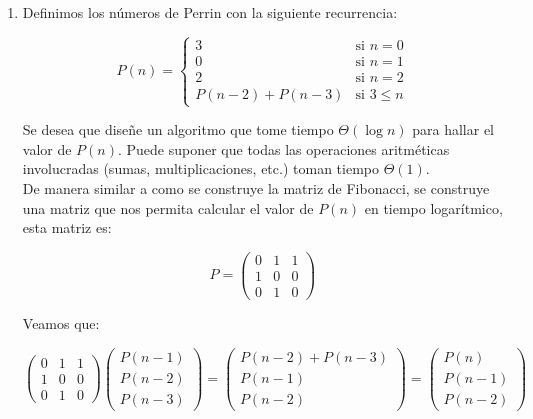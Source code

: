 \documentclass[letterpaper, 12pt]{article}
\begin{document}
\begin{enumerate}
\item Definimos los números de Perrin con la siguiente recurrencia:

\[
P(n) =
\begin{cases}
    3 & \text{si } n = 0 \\
    0 & \text{si } n = 1 \\
    2 & \text{si } n = 2 \\
    P(n - 2) + P(n - 3) & \text{si } 3 \leq n
\end{cases}
\]

Se desea que diseñe un algoritmo que tome tiempo $\Theta(\log n)$ para hallar el valor de $P(n)$. Puede suponer que todas las operaciones aritméticas involucradas (sumas, multiplicaciones, etc.) toman tiempo $\Theta(1)$. \\

De manera similar a como se construye la matriz de Fibonacci, se construye una matriz que nos permita calcular el valor de $P(n)$ en tiempo logarítmico, esta matriz es:

\begin{equation*}
    P =
\begin{pmatrix}
        0 & 1 & 1 \\
        1 & 0 & 0 \\
        0 & 1 & 0
\end{pmatrix}
\end{equation*}

Veamos que:

\begin{equation*}
\begin{pmatrix}
        0 & 1 & 1 \\
        1 & 0 & 0 \\
        0 & 1 & 0
\end{pmatrix}
\begin{pmatrix}
        P(n - 1) \\
        P(n - 2) \\
        P(n - 3)
\end{pmatrix}
=
\begin{pmatrix}
        P(n - 2) + P(n - 3) \\
        P(n - 1) \\
        P(n - 2)
\end{pmatrix}
=
\begin{pmatrix}
        P(n) \\
        P(n - 1) \\
        P(n - 2)
\end{pmatrix}
\end{equation*}


\end{enumerate}
\end{document}
